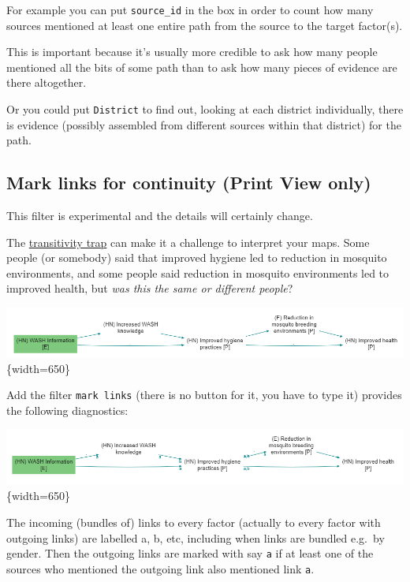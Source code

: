 \documentclass[
]{book}
\begin{document}
For example you can put \texttt{source\_id} in the box in order to count how many sources mentioned at least one entire path from the source to the target factor(s).

This is important because it's usually more credible to ask how many people mentioned all the bits of some path than to ask how many pieces of evidence are there altogether.

Or you could put \texttt{District} to find out, looking at each district individually, there is evidence (possibly assembled from different sources within that district) for the path.

\hypertarget{mark-links-for-continuity-print-view-only}{%
\subsection{Mark links for continuity (Print View only)}\label{mark-links-for-continuity-print-view-only}}

This filter is experimental and the details will certainly change.

The \protect\hyperlink{xtransitivity-trap}{transitivity trap} can make it a challenge to interpret your maps. Some people (or somebody) said that improved hygiene led to reduction in mosquito environments, and some people said reduction in mosquito environments led to improved health, but \emph{was this the same or different people}?

\includegraphics[width=6.77083in,height=\textheight]{_assets/image-20211215081735743.png}\{width=650\}

Add the filter \texttt{mark\ links} (there is no button for it, you have to type it) provides the following diagnostics:

\includegraphics[width=6.77083in,height=\textheight]{_assets/image-20211215081328481.png}\{width=650\}

The incoming (bundles of) links to every factor (actually to every factor with outgoing links) are labelled a, b, etc, including when links are bundled e.g.~by gender. Then the outgoing links are marked with say \texttt{a} if at least one of the sources who mentioned the outgoing link also mentioned link \texttt{a}.
\end{document}
